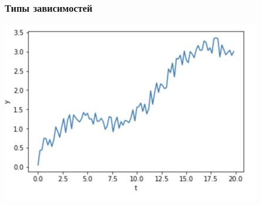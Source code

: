 \documentclass[fullscreen=true, bookmarks=true, hyperref={pdfencoding=unicode}]{beamer}
\begin{document}
\begin{frame}
  \frametitle{Типы зависимостей}

  \begin{center}
    \includegraphics[keepaspectratio,
                   width=.5\paperwidth]{raw_signal.jpg}
  \end{center}


\end{frame}
\end{document}
